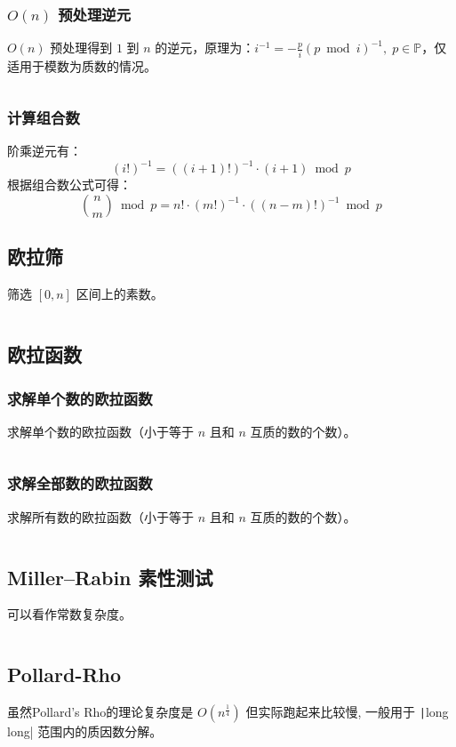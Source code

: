 \documentclass[a4paper, twoside]{article}
\begin{document}
    \subsubsection{$O(n)$ 预处理逆元}
    $O(n)$ 预处理得到 $1$ 到 $n$ 的逆元，原理为：$i ^ {-1} = - \frac p i \left( p \bmod i \right) ^ {-1},\; p \in \mathbb{P}$，仅适用于模数为质数的情况。
    \inputminted{cpp}{../src/数论/O(n)预处理逆元.cpp}

    \subsubsection{计算组合数}
    阶乘逆元有：
    $$(i!)^{-1}=((i+1)!)^{-1} \cdot (i+1) \bmod p$$
    根据组合数公式可得：
    $$\binom{n}{m} \bmod p = n! \cdot (m!)^{−1} \cdot ((n−m)!)^{−1} \bmod p$$

\subsection{欧拉筛}
筛选 $[0,n]$ 区间上的素数。
\inputminted{cpp}{../src/数论/欧拉筛.cpp}

\subsection{欧拉函数}
    \subsubsection{求解单个数的欧拉函数}
    求解单个数的欧拉函数（小于等于 $n$ 且和 $n$ 互质的数的个数）。
    \inputminted{cpp}{../src/数论/欧拉函数（求解单个数的欧拉函数）.cpp}

    \subsubsection{求解全部数的欧拉函数}
    求解所有数的欧拉函数（小于等于 $n$ 且和 $n$ 互质的数的个数）。
    \inputminted{cpp}{../src/数论/欧拉函数（求解全部数的欧拉函数）.cpp}

\subsection{Miller–Rabin 素性测试}
可以看作常数复杂度。
\inputminted{cpp}{../src/数论/Miller–Rabin素性测试.cpp}

\subsection{Pollard-Rho}
虽然Pollard's Rho的理论复杂度是 $O(n ^ {\frac{1}{4}})$ 但实际跑起来比较慢, 一般用于 \texttt|long long| 范围内的质因数分解。
\inputminted{cpp}{../src/数论/Pollard-Rho.cpp}
\end{document}
